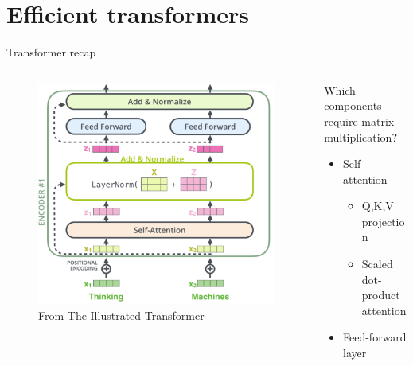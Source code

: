 \documentclass[usenames,dvipsnames,notes,11pt,aspectratio=169,hyperref={colorlinks=true, linkcolor=blue}]{beamer}
\begin{document}
\section{Efficient transformers}

\begin{frame}
    {Transformer recap}
    \begin{columns}
        \begin{column}{0.4\textwidth}
    \begin{figure}
        \includegraphics[width=\textwidth]{figures/transformer-block}
        \caption{From \href{https://jalammar.github.io/illustrated-transformer}{The Illustrated Transformer}}
    \end{figure}
        \end{column}
        \begin{column}{0.6\textwidth}
            Which components require matrix multiplication?\\
            \pause
            \begin{itemize}
                \item Self-attention 
                    \begin{itemize}
                        \item Q,K,V projection
                        \item Scaled dot-product attention
                    \end{itemize}
                \item Feed-forward layer
            \end{itemize}
        \end{column}
    \end{columns}
\end{frame}
\end{document}
